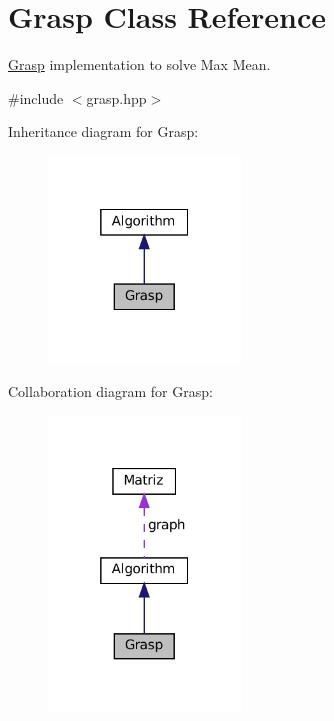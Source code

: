 \hypertarget{classGrasp}{}\section{Grasp Class Reference}
\label{classGrasp}


\hyperlink{classGrasp}{Grasp} implementation to solve Max Mean.  




{\ttfamily \#include $<$grasp.\+hpp$>$}



Inheritance diagram for Grasp\+:
\nopagebreak
\begin{figure}[H]
\begin{center}
\leavevmode
\includegraphics[width=145pt]{classGrasp__inherit__graph}
\end{center}
\end{figure}


Collaboration diagram for Grasp\+:
\nopagebreak
\begin{figure}[H]
\begin{center}
\leavevmode
\includegraphics[width=145pt]{classGrasp__coll__graph}
\end{center}
\end{figure}
